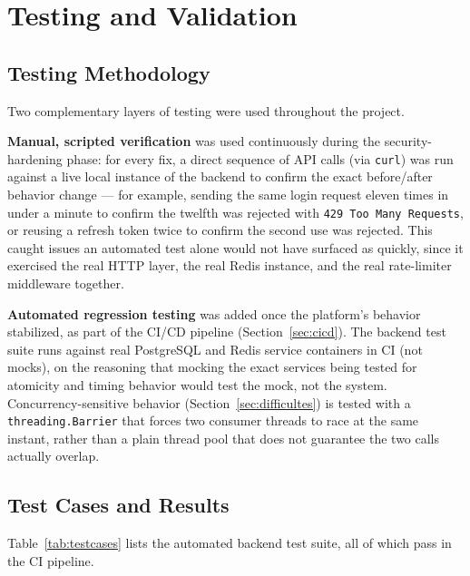 \chapter{Testing and Validation}
\label{chap:tests}

\section{Testing Methodology}

Two complementary layers of testing were used throughout the project.

\textbf{Manual, scripted verification} was used continuously during the security-hardening phase: for every fix, a direct sequence of API calls (via \texttt{curl}) was run against a live local instance of the backend to confirm the exact before/after behavior change --- for example, sending the same login request eleven times in under a minute to confirm the twelfth was rejected with \texttt{429 Too Many Requests}, or reusing a refresh token twice to confirm the second use was rejected. This caught issues an automated test alone would not have surfaced as quickly, since it exercised the real HTTP layer, the real Redis instance, and the real rate-limiter middleware together.

\textbf{Automated regression testing} was added once the platform's behavior stabilized, as part of the CI/CD pipeline (Section~\ref{sec:cicd}). The backend test suite runs against real PostgreSQL and Redis service containers in CI (not mocks), on the reasoning that mocking the exact services being tested for atomicity and timing behavior would test the mock, not the system. Concurrency-sensitive behavior (Section~\ref{sec:difficultes}) is tested with a \texttt{threading.Barrier} that forces two consumer threads to race at the same instant, rather than a plain thread pool that does not guarantee the two calls actually overlap.

\section{Test Cases and Results}

Table~\ref{tab:testcases} lists the automated backend test suite, all of which pass in the CI pipeline.

